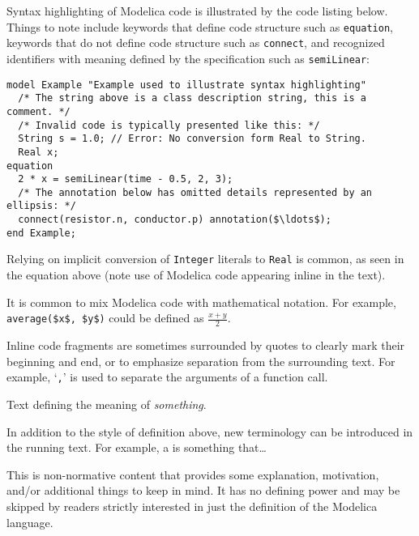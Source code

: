 Syntax highlighting of Modelica code is illustrated by the code listing below.
Things to note include keywords that define code structure such as \lstinline!equation!, keywords that do not define code structure such as \lstinline!connect!, and recognized identifiers with meaning defined by the specification such as \lstinline!semiLinear!:
\begin{lstlisting}[language=modelica]
model Example "Example used to illustrate syntax highlighting"
  /* The string above is a class description string, this is a comment. */
  /* Invalid code is typically presented like this: */
  String s = 1.0; // Error: No conversion form Real to String.
  Real x;
equation
  2 * x = semiLinear(time - 0.5, 2, 3);
  /* The annotation below has omitted details represented by an ellipsis: */
  connect(resistor.n, conductor.p) annotation($\ldots$);
end Example;
\end{lstlisting}

Relying on implicit conversion of \lstinline!Integer! literals to \lstinline!Real! is common, as seen in the equation above (note use of Modelica code appearing inline in the text).

It is common to mix Modelica code with mathematical notation.
For example, \lstinline!average($x$, $y$)! could be defined as $\frac{x + y}{2}$.

Inline code fragments are sometimes surrounded by quotes to clearly mark their beginning and end, or to emphasize separation from the surrounding text.
For example, `\lstinline!,!' is used to separate the arguments of a function call.

\begin{definition}[Something]%
Text defining the meaning of \emph{something}.
\end{definition}

In addition to the style of definition above, new terminology can be introduced in the running text.
For example, a  is something that\ldots

\begin{nonnormative}
This is non-normative content that provides some explanation, motivation, and/or additional things to keep in mind.
It has no defining power and may be skipped by readers strictly interested in just the definition of the Modelica language.
\end{nonnormative}

